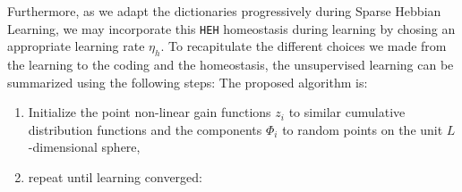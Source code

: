 \documentclass[a4paper, 11pt, draft]{article} %
\newcommand{\coef}{\mathbf{a}} %
\newcommand{\image}{\mathbf{I}} %
\newcommand{\dico}{\Phi} %
\newcommand{\norm}[1]{|\!| #1 |\!|}
\newcommand{\seeEq}[1]{Eq.~\ref{eq:#1}}%
\begin{document}
Furthermore, as we adapt the dictionaries progressively during Sparse Hebbian Learning, we may incorporate this \texttt{HEH} homeostasis during learning by chosing an appropriate learning rate $\eta_h$.
To recapitulate the different choices we made from the learning to the coding and the homeostasis, the unsupervised learning can be summarized using the following steps:
The proposed algorithm is:
\begin{enumerate}%
\item Initialize the point non-linear gain functions $z_i$ to similar cumulative distribution functions and the components $\dico_i$ to random points on the unit $L$-dimensional sphere,%
\item repeat until learning converged:%
\end{enumerate}
\end{document}
